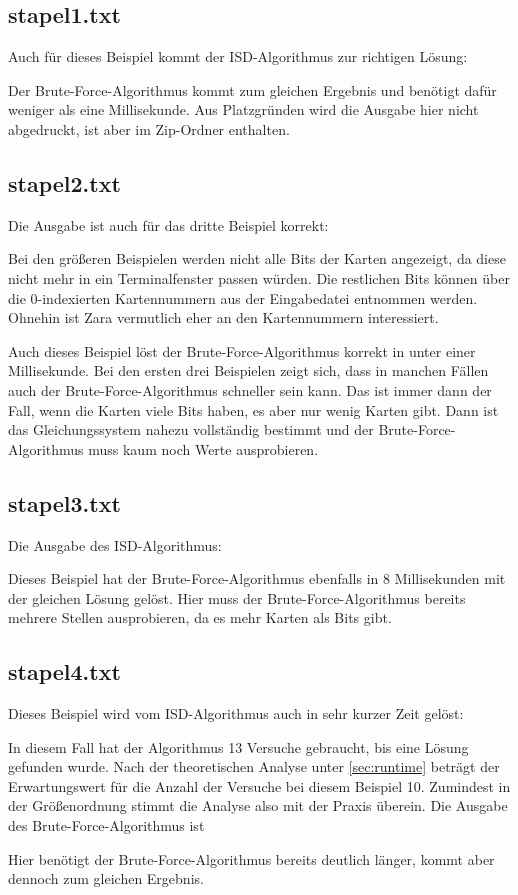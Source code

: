\documentclass[a4paper,10pt,ngerman]{scrartcl}
\begin{document}
\subsection*{stapel1.txt}
Auch für dieses Beispiel kommt der ISD-Algorithmus zur richtigen Lösung:

Der Brute-Force-Algorithmus kommt zum gleichen Ergebnis und benötigt dafür weniger als eine Millisekunde. Aus Platzgründen wird die Ausgabe hier nicht abgedruckt, ist aber im Zip-Ordner enthalten.
\subsection*{stapel2.txt}
Die Ausgabe ist auch für das dritte Beispiel korrekt:

Bei den größeren Beispielen werden nicht alle Bits der Karten angezeigt, da diese nicht mehr in ein Terminalfenster passen würden. Die restlichen Bits können über die 0-indexierten Kartennummern aus der Eingabedatei entnommen werden. Ohnehin ist Zara vermutlich eher an den Kartennummern interessiert. 

Auch dieses Beispiel löst der Brute-Force-Algorithmus korrekt in unter einer Millisekunde. Bei den ersten drei Beispielen zeigt sich, dass in manchen Fällen auch der Brute-Force-Algorithmus schneller sein kann. Das ist immer dann der Fall, wenn die Karten viele Bits haben, es aber nur wenig Karten gibt. Dann ist das Gleichungssystem nahezu vollständig bestimmt und der Brute-Force-Algorithmus muss kaum noch Werte ausprobieren. 
\subsection*{stapel3.txt}
Die Ausgabe des ISD-Algorithmus:

Dieses Beispiel hat der Brute-Force-Algorithmus ebenfalls in 8 Millisekunden mit der gleichen Lösung gelöst.
Hier muss der Brute-Force-Algorithmus bereits mehrere Stellen ausprobieren, da es mehr Karten als Bits gibt.
\subsection*{stapel4.txt}
Dieses Beispiel wird vom ISD-Algorithmus auch in sehr kurzer Zeit gelöst:

In diesem Fall hat der Algorithmus 13 Versuche gebraucht, bis eine Lösung gefunden wurde. Nach der theoretischen Analyse unter \ref{sec:runtime} beträgt der Erwartungswert für die Anzahl der Versuche bei diesem Beispiel 10. Zumindest in der Größenordnung stimmt die Analyse also mit der Praxis überein. 
Die Ausgabe des Brute-Force-Algorithmus ist

Hier benötigt der Brute-Force-Algorithmus bereits deutlich länger, kommt aber dennoch zum gleichen Ergebnis. 
\end{document}
